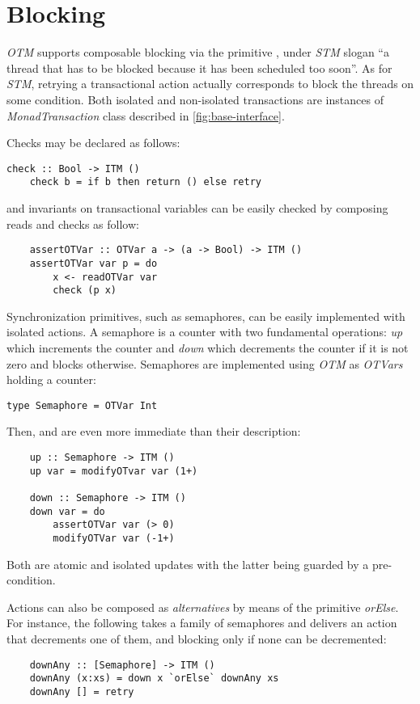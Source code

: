 \section{Blocking}
\emph{OTM} supports composable blocking via the primitive , 
under \emph{STM} slogan ``a thread that has to be blocked because it has 
been scheduled too soon''. As for \emph{STM}, retrying a transactional action 
actually corresponds to block the threads on some condition. Both isolated and non-isolated transactions are instances of \emph{MonadTransaction} class described in \cref{fig:base-interface}.

Checks may be declared as follows:
\begin{Verbatim}[tabsize=3, xleftmargin=1ex, gobble=1]
    check :: Bool -> ITM ()
    check b = if b then return () else retry
\end{Verbatim}
and invariants on transactional variables can be easily checked by composing reads and checks as follow:
\begin{Verbatim}
    assertOTVar :: OTVar a -> (a -> Bool) -> ITM ()
    assertOTVar var p = do
        x <- readOTVar var
        check (p x)
\end{Verbatim}

Synchronization primitives, such as semaphores, can be easily implemented with isolated actions.
A semaphore is a counter with two fundamental operations: \emph{up} which increments the counter and \emph{down} which decrements the counter if it is not zero and blocks otherwise.
Semaphores are implemented using \emph{OTM} as \emph{OTVars} holding a counter:
\begin{Verbatim}[tabsize=3, xleftmargin=1ex, gobble=1]
    type Semaphore = OTVar Int
\end{Verbatim}
Then,  and  are even more immediate than their description:
\begin{Verbatim}
    up :: Semaphore -> ITM ()
    up var = modifyOTvar var (1+)

    down :: Semaphore -> ITM ()
    down var = do
        assertOTVar var (> 0)
        modifyOTVar var (-1+)
\end{Verbatim}
Both are atomic and isolated updates with the latter being guarded by a pre-condition.

Actions can also be composed as \emph{alternatives} by means of the primitive \emph{orElse}. For instance, the following takes a family of semaphores and delivers an action that decrements one of them, and blocking only if none can be decremented:
\begin{Verbatim}
    downAny :: [Semaphore] -> ITM ()
    downAny (x:xs) = down x `orElse` downAny xs
    downAny [] = retry
\end{Verbatim}

